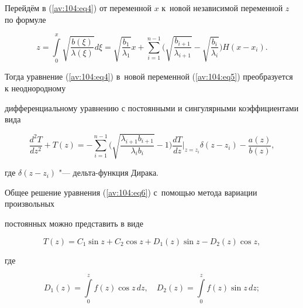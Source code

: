 Перейдём в (\ref{av:104:eq4}) от переменной $x$ к~новой независимой переменной $z$ по формуле

\begin{equation}

\label{av:104:eq5}

z=\int\limits_0^x \sqrt {\frac{b(\xi )}{\lambda (\xi )}}  d\xi =\sqrt

{\frac{b_1 }{\lambda _1 }} x+\sum\limits_{i=1}^{n-1} \biggl( {\sqrt

{\frac{b_{i+1} }{\lambda _{i+1} }} -\sqrt {\frac{b_i }{\lambda _i }} }

\biggr) H(x-x_i ).

\end{equation}



Тогда уравнение (\ref{av:104:eq4}) в~новой переменной (\ref{av:104:eq5}) преобразуется к неоднородному

дифференциальному уравнению с постоянными и сингулярными коэффициентами вида

\begin{equation}

\label{av:104:eq6}

\frac{d^2T}{dz^2}+T(z)=-\sum\limits_{i=1}^{n-1} \biggl(

\sqrt{\frac{\lambda _{i+1} b_{i+1} }{\lambda _i b_i } } -1 \biggr)

\frac{dT}{dz}\Big|_{z=z_i } \delta (z-z_i )-\frac{a(z)}{b(z)},

\end{equation}

где $\delta (z-z_i ) $ "--- дельта-функция Дирака.





Общее решение уравнения (\ref{av:104:eq6}) с~помощью метода вариации произвольных

постоянных можно представить в виде

\begin{equation}

\label{av:104:eq7}

T(z)=C_1 \sin z+C_2 \cos z+D_1 (z)\sin z-D_2 (z)\cos z,

\end{equation}

где

$$

D_1 (z)=\int\limits_0^z f(z)\cos z\, dz, \quad

D_2 (z)=\int\limits_0^z f(z)\sin z\, dz ;$$

